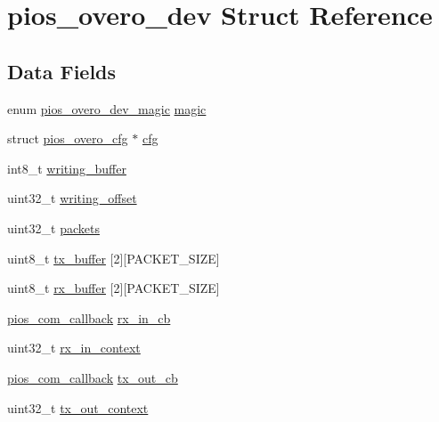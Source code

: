\hypertarget{structpios__overo__dev}{\section{pios\-\_\-overo\-\_\-dev \-Struct \-Reference}
\label{structpios__overo__dev}
}
\subsection*{\-Data \-Fields}
\begin{DoxyCompactItemize}
\item 
enum \hyperlink{group___p_i_o_s___o_v_e_r_o_ga9b9fb7573bead7d69299823fb7f7a372}{pios\-\_\-overo\-\_\-dev\-\_\-magic} \hyperlink{structpios__overo__dev_a6d9be49c3c20b721ac63620ce90d30ae}{magic}
\item 
struct \hyperlink{structpios__overo__cfg}{pios\-\_\-overo\-\_\-cfg} $\ast$ \hyperlink{structpios__overo__dev_a8bb10a548957bcd5da841fcd655b14d2}{cfg}
\item 
int8\-\_\-t \hyperlink{structpios__overo__dev_a87dbb1f454559bb6df624368972b0cf6}{writing\-\_\-buffer}
\item 
uint32\-\_\-t \hyperlink{structpios__overo__dev_a8fc21eb0e95dfbe473205d659e4678f4}{writing\-\_\-offset}
\item 
uint32\-\_\-t \hyperlink{structpios__overo__dev_ad0b4a0ccb4fb05b14cc21805b5dbe9b9}{packets}
\item 
uint8\-\_\-t \hyperlink{structpios__overo__dev_a48dfcb09b1a3c648ab7d1e2c79f4094e}{tx\-\_\-buffer} \mbox{[}2\mbox{]}\mbox{[}\-P\-A\-C\-K\-E\-T\-\_\-\-S\-I\-Z\-E\mbox{]}
\item 
uint8\-\_\-t \hyperlink{structpios__overo__dev_a638ed3a9ebc43e2ce3477041a7f68a95}{rx\-\_\-buffer} \mbox{[}2\mbox{]}\mbox{[}\-P\-A\-C\-K\-E\-T\-\_\-\-S\-I\-Z\-E\mbox{]}
\item 
\hyperlink{group___p_i_o_s___c_o_m_ga23f1888821f1f74a50c02adc459df597}{pios\-\_\-com\-\_\-callback} \hyperlink{structpios__overo__dev_acba008cacb6d3478462b4c681b60a158}{rx\-\_\-in\-\_\-cb}
\item 
uint32\-\_\-t \hyperlink{structpios__overo__dev_acd9b0fbbf1587d730b3a91eaeee52253}{rx\-\_\-in\-\_\-context}
\item 
\hyperlink{group___p_i_o_s___c_o_m_ga23f1888821f1f74a50c02adc459df597}{pios\-\_\-com\-\_\-callback} \hyperlink{structpios__overo__dev_a6814eae0437a37c8b5319b0ef88b7459}{tx\-\_\-out\-\_\-cb}
\item 
uint32\-\_\-t \hyperlink{structpios__overo__dev_aae8b1053ce480f2829ac18c7a490c010}{tx\-\_\-out\-\_\-context}
\end{DoxyCompactItemize}


